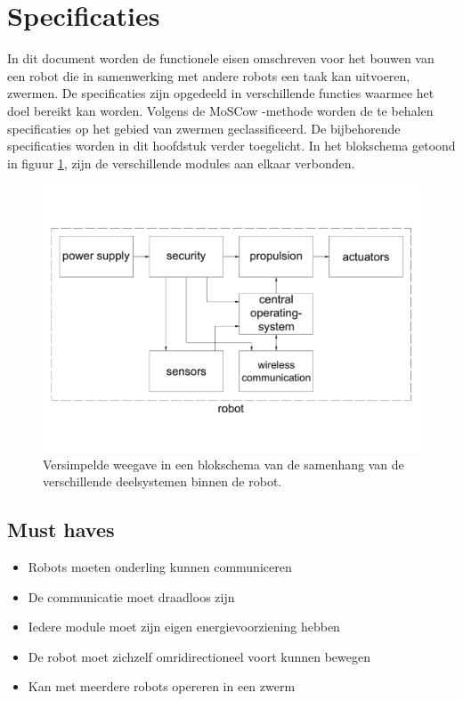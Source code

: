 \documentclass[10pt,a4paper]{article}
\begin{document}
\section{Specificaties}
In dit document worden de functionele eisen omschreven voor het bouwen van een robot die in samenwerking met andere robots een taak kan uitvoeren, zwermen. De specificaties zijn opgedeeld in verschillende functies waarmee het doel bereikt kan worden. 
Volgens de MoSCow -methode worden de te behalen specificaties op het gebied van zwermen geclassificeerd. De bijbehorende specificaties worden in dit hoofdstuk verder toegelicht. In het blokschema getoond in figuur \ref{fig:blockschematic}, zijn de verschillende modules aan elkaar verbonden. 

\begin{figure}[h]
    \centering
    \includegraphics[width=1\textwidth]{blockschematic}
    \caption{Versimpelde weegave in een blokschema van de samenhang van de verschillende deelsystemen binnen de robot.}
    \label{fig:blockschematic}
\end{figure}



\subsection{Must haves}
\begin{itemize}
\item Robots moeten onderling kunnen communiceren
\item De communicatie moet draadloos zijn
\item Iedere module moet zijn eigen energievoorziening hebben
\item De robot moet zichzelf omridirectioneel voort kunnen bewegen
\item Kan met meerdere robots opereren in een zwerm
\end{itemize}
\end{document}
